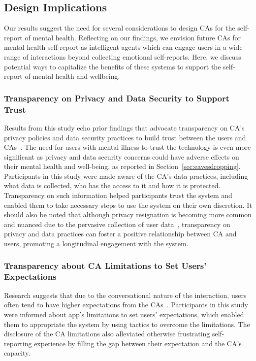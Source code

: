     \subsection{Design Implications}
        Our results suggest the need for several considerations to design \ac{CA}s for the self-report of mental health. Reflecting on our findings, we envision future \ac{CA}s for mental health self-report as intelligent agents which can engage users in a wide range of interactions beyond collecting emotional self-reports. 
        Here, we discuss potential ways to capitalize the benefits of these systems to support the self-report of mental health and wellbeing.
        
        \subsubsection{Transparency on Privacy and Data Security to Support Trust}
            Results from this study echo prior findings that advocate transparency on \ac{CA}'s privacy policies and data security practices to build trust between the users and \ac{CA}s~\cite{lau2018alexa}. The need for users with mental illness to trust the technology is even more significant as privacy and data security concerns could have adverse effects on their mental health and well-being, as reported in Section~\ref{sec:eavesdropping}. Participants in this study were made aware of the \ac{CA}'s data practices, including what data is collected, who has the access to it and how it is protected. Transparency on such information helped participants trust the system and enabled them to take necessary steps to use the system on their own discretion. It should also be noted that although privacy resignation is becoming more common and nuanced due to the pervasive collection of user data~\cite{lau2018alexa}, transparency on privacy and data practices can foster a positive relationship between \ac{CA} and users, promoting a longitudinal engagement with the system.
            
        \subsubsection{Transparency about \ac{CA} Limitations to Set Users' Expectations}
            Research suggests that due to the conversational nature of the interaction, users often tend to have higher expectations from the \ac{CA}s~\cite{Gulfbetwee2016ewa}. Participants in this study were informed about \acl{app}'s limitations to set users' expectations, which enabled them to appropriate the system by using tactics to overcome the limitations. The disclosure of the \ac{CA} limitations also alleviated otherwise frustrating self-reporting experience by filling the gap between their expectation and the \ac{CA}'s capacity.
        
